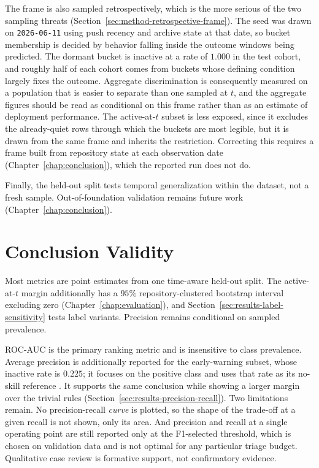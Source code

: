 The frame is also sampled retrospectively, which is the more serious of the two
sampling threats (Section~\ref{sec:method-retrospective-frame}). The seed was
drawn on \texttt{2026-06-11} using push recency and archive state at that date,
so bucket membership is decided by behavior falling inside the outcome windows
being predicted. The dormant bucket is inactive at a rate of \(1.000\) in the
test cohort, and roughly half of each cohort comes from buckets whose defining
condition largely fixes the outcome. Aggregate discrimination is consequently
measured on a population that is easier to separate than one sampled at \(t\),
and the aggregate figures should be read as conditional on this frame rather than
as an estimate of deployment performance. The active-at-\(t\) subset is less
exposed, since it excludes the already-quiet rows through which the buckets are
most legible, but it is drawn from the same frame and inherits the restriction.
Correcting this requires a frame built from repository state at each observation
date (Chapter~\ref{chap:conclusion}), which the reported run does not
do.

Finally, the held-out split tests temporal generalization within the dataset, not
a fresh sample. Out-of-foundation validation remains future work
(Chapter~\ref{chap:conclusion}).

\section{Conclusion Validity}
\label{sec:validity-conclusion}

Most metrics are point estimates from one time-aware held-out split. The
active-at-\(t\) margin additionally has a \(95\%\) repository-clustered bootstrap
interval excluding zero (Chapter~\ref{chap:evaluation}), and
Section~\ref{sec:results-label-sensitivity} tests label variants. Precision
remains conditional on sampled prevalence.

ROC-AUC is the primary ranking metric and is insensitive to class prevalence.
Average precision is additionally reported for the early-warning subset, whose
inactive rate is \(0.225\); it focuses on the positive class and uses that rate
as its no-skill reference \cite{saito2015precision}. It supports the same
conclusion while showing a larger margin over the trivial rules
(Section~\ref{sec:results-precision-recall}).
Two limitations remain. No precision-recall \emph{curve} is plotted, so the
shape of the trade-off at a given recall is not shown, only its area. And
precision and recall at a single operating point are still reported only at the
F1-selected threshold, which is chosen on validation data and is not optimal for
any particular triage budget. Qualitative case review is formative support, not
confirmatory evidence.
